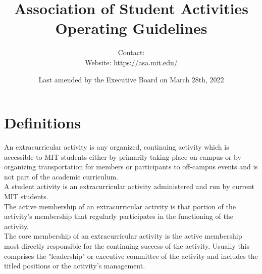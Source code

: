 \documentclass[12pt]{article}
\def\groupname{Association of Student Activities\xspace}
\begin{document}
\title{\groupname\\ Operating Guidelines}
\author{%
    Contact:  \\
    Website: \url{https://asa.mit.edu/}
}
\date{Last amended by the Executive Board on March 28th, 2022}

\def\ul{\underline}

\maketitle

\label{art:groups}

\section{Definitions}
An extracurricular activity is any organized, continuing activity which is accessible to MIT students
either by primarily taking place on campus or by organizing transportation for members or participants to
off-campus events and is not part of the academic curriculum.
\\

A student activity is an extracurricular activity administered and run by current MIT students.
\\

The active membership of an extracurricular activity is that portion of the activity’s membership that
regularly participates in the functioning of the activity.
\\

The core membership of an extracurricular activity is the active membership most directly responsible
for the continuing success of the activity. Usually this comprises the "leadership" or executive
committee of the activity and includes the titled positions or the activity’s management.
\end{document}
